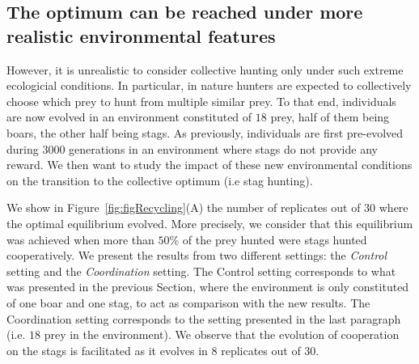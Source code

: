   \subsection{The optimum can be reached under more realistic environmental features}
    However, it is unrealistic to consider collective hunting only under such extreme ecologicial conditions. In particular, in nature hunters are expected to collectively choose which prey to hunt from multiple similar prey. To that end, individuals are now evolved in an environment constituted of $18$ prey, half of them being boars, the other half being stags. As previously, individuals are first pre-evolved during $3000$ generations in an environment where stags do not provide any reward. We then want to study the impact of these new environmental conditions on the transition to the collective optimum (i.e stag hunting).

    We show in Figure~\ref{fig:figRecycling}(A) the number of replicates out of $30$ where the optimal equilibrium evolved. More precisely, we consider that this equilibrium was achieved when more than \(50\%\) of the prey hunted were stags hunted cooperatively. We present the results from two different settings: the \emph{Control} setting and the \emph{Coordination} setting. The Control setting corresponds to what was presented in the previous Section, where the environment is only constituted of one boar and one stag, to act as comparison with the new results. The Coordination setting corresponds to the setting presented in the last paragraph (i.e. $18$ prey in the environment). We observe that the evolution of cooperation on the stags is facilitated as it evolves in $8$ replicates out of $30$. 

